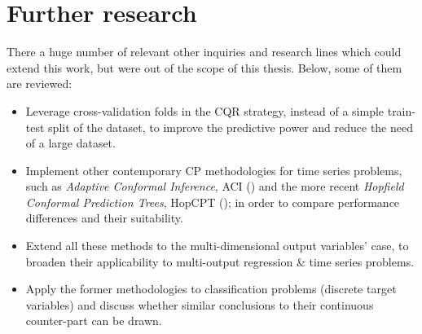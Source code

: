 \section{Further research}\label{sec:further-research}

There a huge number of relevant other inquiries and research lines which could extend this work, but were out of the scope of this thesis. 
Below, some of them are reviewed: 
\begin{itemize}
\item Leverage cross-validation folds in the CQR strategy, instead of a simple train-test split of the dataset, to improve the predictive power and reduce the need of a large dataset. 
\item Implement other contemporary CP methodologies for time series problems, such as \textit{Adaptive Conformal Inference}, ACI (\cite{gibbs2021}) and the more recent \textit{Hopfield Conformal Prediction Trees}, HopCPT (\cite{auer2023}); in order to compare performance differences and their suitability.
\item Extend all these methods to the multi-dimensional output variables' case, to broaden their applicability to multi-output regression \& time series problems.
\item Apply the former methodologies to classification problems (discrete target variables) and discuss whether similar conclusions to their continuous counter-part can be drawn.
\end{itemize}